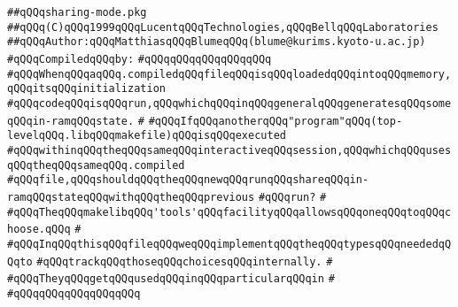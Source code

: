 \label{src/app/makelib/stuff/sharing-mode.pkg}
\verb|##qQQqsharing-mode.pkg|\newline
\verb|##qQQq(C)qQQq1999qQQqLucentqQQqTechnologies,qQQqBellqQQqLaboratories|\newline
\verb|##qQQqAuthor:qQQqMatthiasqQQqBlumeqQQq(blume@kurims.kyoto-u.ac.jp)|\newline
\newline
\verb|#qQQqCompiledqQQqby:|\newline
\verb|#qQQqqQQqqQQqqQQqqQQq|\newline
\newline
\newline
\newline
\verb|#qQQqWhenqQQqaqQQq.compiledqQQqfileqQQqisqQQqloadedqQQqintoqQQqmemory,qQQqitsqQQqinitialization|\newline
\verb|#qQQqcodeqQQqisqQQqrun,qQQqwhichqQQqinqQQqgeneralqQQqgeneratesqQQqsomeqQQqin-ramqQQqstate.|\newline
\verb|#|\newline
\verb|#qQQqIfqQQqanotherqQQq"program"qQQq(top-levelqQQq.libqQQqmakefile)qQQqisqQQqexecuted|\newline
\verb|#qQQqwithinqQQqtheqQQqsameqQQqinteractiveqQQqsession,qQQqwhichqQQqusesqQQqtheqQQqsameqQQq.compiled|\newline
\verb|#qQQqfile,qQQqshouldqQQqtheqQQqnewqQQqrunqQQqshareqQQqin-ramqQQqstateqQQqwithqQQqtheqQQqprevious|\newline
\verb|#qQQqrun?|\newline
\verb|#|\newline
\verb|#qQQqTheqQQqmakelibqQQq'tools'qQQqfacilityqQQqallowsqQQqoneqQQqtoqQQqchoose.qQQq|\newline
\verb|#|\newline
\verb|#qQQqInqQQqthisqQQqfileqQQqweqQQqimplementqQQqtheqQQqtypesqQQqneededqQQqto|\newline
\verb|#qQQqtrackqQQqthoseqQQqchoicesqQQqinternally.|\newline
\verb|#|\newline
\verb|#qQQqTheyqQQqgetqQQqusedqQQqinqQQqparticularqQQqin|\newline
\verb|#|\newline
\verb|#qQQqqQQqqQQqqQQqqQQq|\newline
\newline

